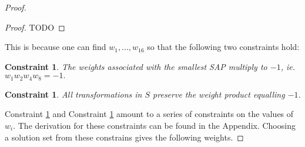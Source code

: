 \documentclass[12pt]{article}
\theoremstyle{plain}
\newtheorem{constraint}[thm]{Constraint}
\theoremstyle{definition}
\theoremstyle{remark}
\theoremstyle{definition}
\begin{document}
\begin{proof}
\begin{proof}
    TODO
\end{proof}

This is because one can find $w_{1} , \dots, w_{16}$ so that the following two constraints hold:

\begin{constraint}
    \label{constraint: smallest sap prod}
    The weights associated with the smallest SAP multiply to $-1$, ie. $w_1 w_2 w_4 w_8 = -1.$ 
\end{constraint}
\begin{constraint}
    \label{constraint: prod works}
    \emph{All} transformations in $S$ preserve the weight product equalling $-1$.
\end{constraint}

Constraint \ref{constraint: smallest sap prod} and Constraint \ref{constraint: prod works} amount to a series of constraints on the values of $w_i$. The derivation for these constraints can be found in the Appendix. Choosing a solution set from these constrains gives the following weights.


\end{proof}
\end{document}
